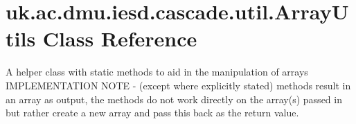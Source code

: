 \hypertarget{classuk_1_1ac_1_1dmu_1_1iesd_1_1cascade_1_1util_1_1_array_utils}{\section{uk.\-ac.\-dmu.\-iesd.\-cascade.\-util.\-Array\-Utils Class Reference}
\label{classuk_1_1ac_1_1dmu_1_1iesd_1_1cascade_1_1util_1_1_array_utils}
}


A helper class with static methods to aid in the manipulation of arrays I\-M\-P\-L\-E\-M\-E\-N\-T\-A\-T\-I\-O\-N N\-O\-T\-E -\/ (except where explicitly stated) methods result in an array as output, the methods do not work directly on the array(s) passed in but rather create a new array and pass this back as the return value.  


